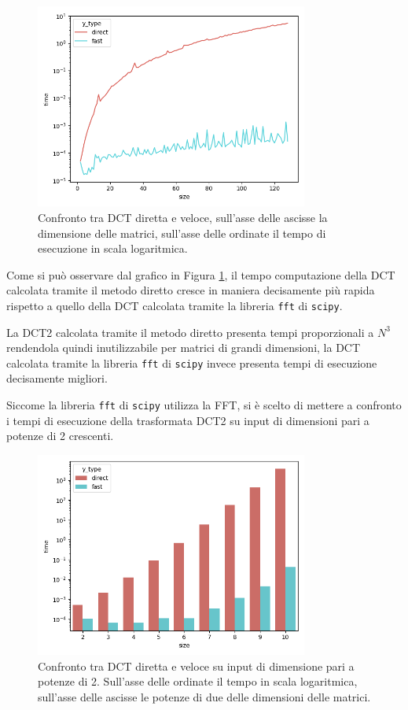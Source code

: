 \documentclass[a4paper, 12pt]{article}
\begin{document}
\begin{figure}[H]
  \centering
	\includegraphics[width=0.8\textwidth]{imgs/bench-incremental-0.png}
	\caption{Confronto tra DCT diretta e veloce, sull'asse delle ascisse la
		dimensione delle matrici, sull'asse delle ordinate il tempo di esecuzione in
		scala logaritmica.}
	\label{fig:incremental-benchmark}
\end{figure}

Come si può osservare dal grafico in Figura
\ref{fig:incremental-benchmark}, il tempo computazione della DCT calcolata
tramite il metodo diretto cresce in maniera decisamente più rapida rispetto a
quello della DCT calcolata tramite la libreria \texttt{fft} di \texttt{scipy}.

La DCT2 calcolata tramite il metodo diretto presenta tempi proporzionali a $N^3$
rendendola quindi inutilizzabile per matrici di grandi dimensioni, la DCT calcolata
tramite la libreria \texttt{fft} di \texttt{scipy} invece presenta tempi di esecuzione 
decisamente migliori.

Siccome la libreria \texttt{fft} di \texttt{scipy} utilizza la FFT, si è scelto
di mettere a confronto i tempi di esecuzione della trasformata DCT2 su input di
dimensioni pari a potenze di 2 crescenti.

\begin{figure}[H]
	\centering
	\includegraphics[width=0.8\textwidth]{imgs/bench-order-0.png}
	\caption{Confronto tra DCT diretta e veloce su input di dimensione pari a
		potenze di 2. Sull'asse delle ordinate il tempo in scala logaritmica,
		sull'asse delle ascisse le potenze di due delle dimensioni delle matrici.}
	\label{fig:order-benchmark}
\end{figure}
\end{document}
